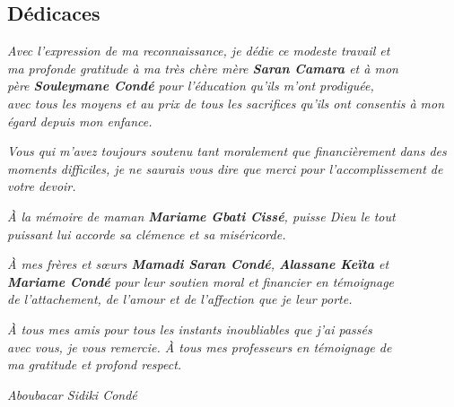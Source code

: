 \documentclass[11pt,a4paper]{article}
\begin{document}
\newpage
\begin{center}
\section*{Dédicaces}
\Large
\textit{%
Avec l’expression de ma reconnaissance, je dédie ce modeste travail et\\
ma profonde gratitude à ma très chère mère \textbf{Saran Camara} et à mon\\
père \textbf{Souleymane Condé} pour l’éducation qu’ils m’ont prodiguée,\\
avec tous les moyens et au prix de tous les sacrifices qu’ils ont consentis à mon égard depuis mon enfance.}

\textit{Vous qui m’avez toujours soutenu tant moralement que financièrement dans des moments difficiles, je ne saurais vous dire que merci pour l’accomplissement de votre devoir.\\[1em]}

\textit{À la mémoire de maman \textbf{Mariame Gbati Cissé}, puisse Dieu le tout\\
puissant lui accorde sa clémence et sa miséricorde.\\[1em]}

\textit{À mes frères et sœurs \textbf{Mamadi Saran Condé}, \textbf{Alassane Keïta} et\\
\textbf{Mariame Condé} pour leur soutien moral et financier en témoignage\\
de l’attachement, de l’amour et de l’affection que je leur porte.\\[1em]}

\textit{À tous mes amis pour tous les instants inoubliables que j’ai passés\\
avec vous, je vous remercie. À tous mes professeurs en témoignage de\\
ma gratitude et profond respect.}

\vspace{2cm}

\begin{flushright}
\Large
\textit{Aboubacar Sidiki Condé}
\end{flushright}
\end{center}
\end{document}

